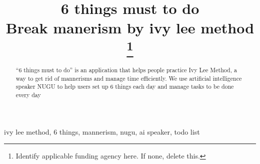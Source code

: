 \documentclass[conference]{IEEEtran}
\begin{document}
\title{6 things must to do\\
{\footnotesize \textsuperscript{}Break manerism by ivy lee method}
\thanks{Identify applicable funding agency here. If none, delete this.}
}

\author{
\and
{}
\and
{}
}

\maketitle

\begin{abstract}
“6 things must to do” is an application that helps people practice Ivy Lee Method, a way to get rid of mannerisms and manage time efficiently. We use artificial intelligence speaker NUGU to help users set up 6 things each day and manage tasks to be done every day
\end{abstract}
\begin{IEEEkeywords}
ivy lee method,  6 things, mannerism, nugu, ai speaker, todo list
\end{IEEEkeywords}
\end{document}
